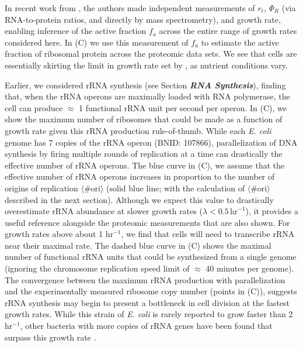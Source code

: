 In recent work from \cite{dai2016}, the authors made independent measurements of
$r_t$, $\Phi_R$ (via RNA-to-protein ratios, and directly by mass spectrometry),
and growth rate, enabling inference of the active fraction $f_a$ across the
entire range of growth rates considered here. In (C) we use this
measurement of $f_a$ to estimate the active fraction of ribosomal protein across
the proteomic data sets. We see that cells are essentially skirting the limit in
growth rate set by , as nutrient
conditions vary.

Earlier, we considered rRNA synthesis (see Section \textit{\bf RNA Synthesis}),
finding that, when the rRNA operons are maximally loaded with RNA polymerase,
the cell can produce $\approx$ 1 functional rRNA unit per second per operon. In
(C), we show the maximum number of ribosomes that could be
made as a function of growth rate given this rRNA production rule-of-thumb.
While each \textit{E. coli} genome has 7 copies of the rRNA operon (BNID:
107866), parallelization of DNA synthesis by firing multiple
rounds of replication at a time can drastically the effective number of rRNA
operons. The blue curve in (C), we assume that the effective
number of rRNA operons increases in proportion to the number of origins of
replication $\langle\text{\# ori}\rangle$ (solid blue line; with the calculation
of $\langle\text{\# ori}\rangle$ described in the next section). Although we
expect this value to drastically overestimate rRNA abundance at slower growth
rates ($\lambda < 0.5\, \text{hr}^{-1}$), it provides a useful reference alongside the proteomic measurements that are also shown. For
growth rates above about 1 hr$^{-1}$, we find that cells will need to transcribe
rRNA near their maximal rate.  The dashed blue curve in (C)
shows the maximal number of functional rRNA units that could be synthesized from
a single genome (ignoring the chromosome replication speed limit of $\approx$ 40
minutes per genome). The convergence between the maximum rRNA production with
parallelization and the experimentally measured ribosome copy number (points in
(C)), suggests rRNA synthesis may begin to present a
bottleneck in cell division at the fastest growth rates. While this strain of
\textit{E. coli} is rarely reported to grow faster than 2 hr$^{-1}$, other
bacteria with more copies of rRNA genes have been found that surpass this growth
rate \citep{bremer2008,roller2016}.
